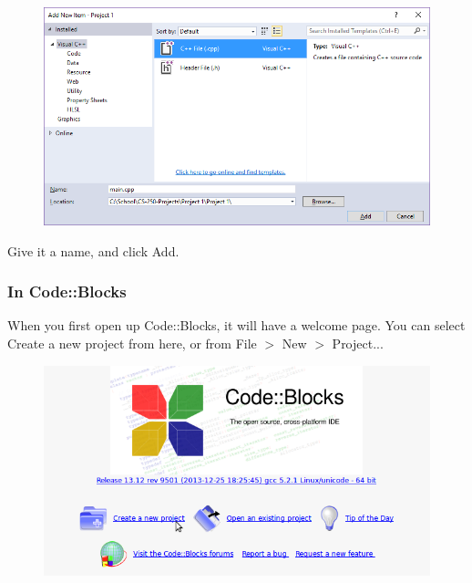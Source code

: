                \begin{figure}[h]
                    \centering
                    \includegraphics[width=14cm]{images-2018-01/vs-newcpp.png}
                \end{figure}

                Give it a name, and click Add.

            \newpage

            \subsubsection{In Code::Blocks}

                When you first open up Code::Blocks, it will have a welcome page.
                You can select Create a new project from here, or from File $>$ New $>$ Project...
            
                \begin{figure}[h]
                    \centering
                    \includegraphics[width=12cm]{images-2018-01/codeblocks_newproject.png}
                \end{figure}

